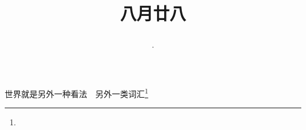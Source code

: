 \title{\date[d=30,m=9,y=2024][year:cn-y,年,month:cn,day:cn,日,·,weekday]·八月廿八 }
世界就是另外一种看法　另外一类词汇\footnote{ }

